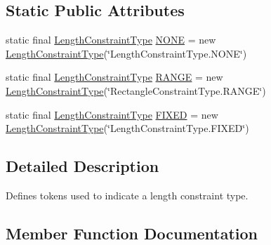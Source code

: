 \subsection*{Static Public Attributes}
\begin{DoxyCompactItemize}
\item 
static final \mbox{\hyperlink{classorg_1_1jfree_1_1chart_1_1block_1_1_length_constraint_type}{Length\+Constraint\+Type}} \mbox{\hyperlink{classorg_1_1jfree_1_1chart_1_1block_1_1_length_constraint_type_aeffd5f876bcf30c0d990eea10e09aa1a}{N\+O\+NE}} = new \mbox{\hyperlink{classorg_1_1jfree_1_1chart_1_1block_1_1_length_constraint_type}{Length\+Constraint\+Type}}(\char`\"{}Length\+Constraint\+Type.\+N\+O\+NE\char`\"{})
\item 
static final \mbox{\hyperlink{classorg_1_1jfree_1_1chart_1_1block_1_1_length_constraint_type}{Length\+Constraint\+Type}} \mbox{\hyperlink{classorg_1_1jfree_1_1chart_1_1block_1_1_length_constraint_type_ab109faf0c5a8c1e9279969ef417ecffd}{R\+A\+N\+GE}} = new \mbox{\hyperlink{classorg_1_1jfree_1_1chart_1_1block_1_1_length_constraint_type}{Length\+Constraint\+Type}}(\char`\"{}Rectangle\+Constraint\+Type.\+R\+A\+N\+GE\char`\"{})
\item 
static final \mbox{\hyperlink{classorg_1_1jfree_1_1chart_1_1block_1_1_length_constraint_type}{Length\+Constraint\+Type}} \mbox{\hyperlink{classorg_1_1jfree_1_1chart_1_1block_1_1_length_constraint_type_ac02152420b14302d97602ec36413f0e8}{F\+I\+X\+ED}} = new \mbox{\hyperlink{classorg_1_1jfree_1_1chart_1_1block_1_1_length_constraint_type}{Length\+Constraint\+Type}}(\char`\"{}Length\+Constraint\+Type.\+F\+I\+X\+ED\char`\"{})
\end{DoxyCompactItemize}


\subsection{Detailed Description}
Defines tokens used to indicate a length constraint type. 

\subsection{Member Function Documentation}
\mbox{\label{classorg_1_1jfree_1_1chart_1_1block_1_1_length_constraint_type_a0a356bd746733c315c7c0e4c7c5a1e92}} 
